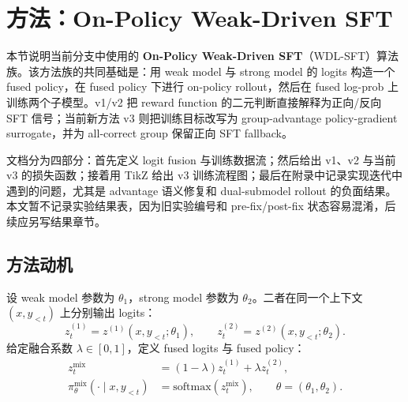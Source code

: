 %

\section{方法：On-Policy Weak-Driven SFT}
\label{sec:method}

本节说明当前分支中使用的 \textbf{On-Policy Weak-Driven SFT}（WDL-SFT）算法族。该方法族的共同基础是：用 weak model 与 strong model 的 logits 构造一个 fused policy，在 fused policy 下进行 on-policy rollout，然后在 fused log-prob 上训练两个子模型。v1/v2 把 reward function 的二元判断直接解释为正向/反向 SFT 信号；当前新方法 v3 则把训练目标改写为 group-advantage policy-gradient surrogate，并为 all-correct group 保留正向 SFT fallback。

文档分为四部分：首先定义 logit fusion 与训练数据流；然后给出 v1、v2 与当前 v3 的损失函数；接着用 TikZ 给出 v3 训练流程图；最后在附录中记录实现迭代中遇到的问题，尤其是 advantage 语义修复和 dual-submodel rollout 的负面结果。本文暂不记录实验结果表，因为旧实验编号和 pre-fix/post-fix 状态容易混淆，后续应另写结果章节。

\subsection{方法动机}
\label{subsec:motivation}

设 weak model 参数为 $\theta_1$，strong model 参数为 $\theta_2$。二者在同一个上下文 $(x,y_{<t})$ 上分别输出 logits：
\begin{equation}
    z^{(1)}_t = z^{(1)}(x,y_{<t};\theta_1),
    \qquad
    z^{(2)}_t = z^{(2)}(x,y_{<t};\theta_2).
\end{equation}
给定融合系数 $\lambda\in[0,1]$，定义 fused logits 与 fused policy：
\begin{align}
    z^{\mathrm{mix}}_t
        &= (1-\lambda)z^{(1)}_t + \lambda z^{(2)}_t, \label{eq:mix_logit}\\
    \pi^{\mathrm{mix}}_\theta(\cdot\mid x,y_{<t})
        &= \mathrm{softmax}\!\left(z^{\mathrm{mix}}_t\right),
        \qquad \theta=(\theta_1,\theta_2). \label{eq:mix_policy}
\end{align}

